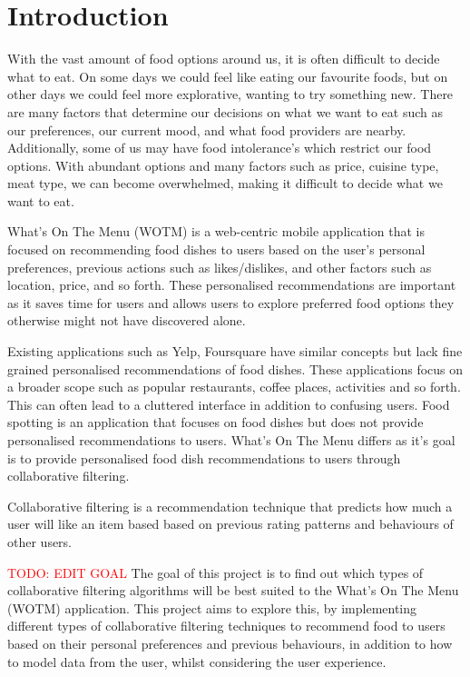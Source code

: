 \chapter{Introduction}\label{C:intro}

With the vast amount of food options around us, it is often difficult to decide what to eat. On some days we could feel like eating our favourite foods, but on other days we could feel more explorative, wanting to try something new. There are many factors that determine our decisions on what we want to eat such as our preferences, our current mood, and what food providers are nearby. Additionally, some of us may have food intolerance's which restrict our food options. With abundant options and many factors such as price, cuisine type, meat type, we can become overwhelmed, making it difficult to decide what we want to eat. 

What’s On The Menu (WOTM) is a web-centric mobile application that is focused on recommending food dishes to users based on the user’s personal preferences, previous actions such as likes/dislikes, and other factors such as location, price, and so forth. These personalised recommendations are important as it saves time for users and allows users to explore preferred food options they otherwise might not have discovered alone. 

Existing applications such as Yelp, Foursquare have similar concepts but lack fine grained personalised recommendations of food dishes. These applications focus on a broader scope such as popular restaurants, coffee places, activities and so forth. This can often lead to a cluttered interface in addition to confusing users. Food spotting is an application that focuses on food dishes but does not provide personalised recommendations to users. What's On The Menu differs as it's goal is to provide personalised food dish recommendations to users through collaborative filtering. 

Collaborative filtering is a recommendation technique that predicts how much a user will like an item based based on previous rating patterns and behaviours of other users. 

\textcolor{red}{TODO: EDIT GOAL}
The goal of this project is to find out which types of collaborative filtering algorithms will be best suited to the What's On The Menu (WOTM) application. This project aims to explore this, by implementing different types of collaborative filtering techniques to recommend food to users based on their personal preferences and previous behaviours, in addition to how to model data from the user, whilst considering the user experience. 

